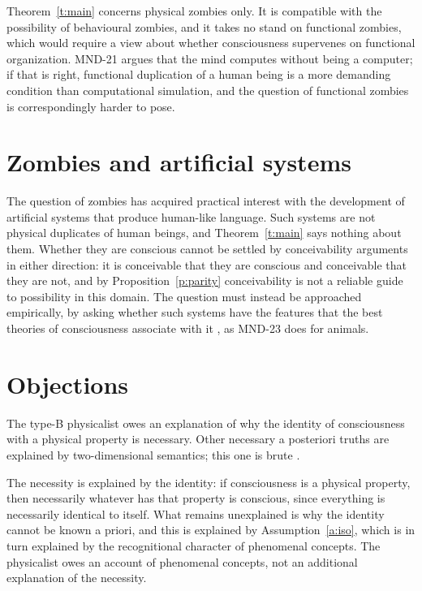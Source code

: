 \documentclass{situationist-preprint}
\begin{document}
Theorem~\ref{t:main} concerns physical zombies only. It is compatible with the possibility of behavioural zombies, and it takes no stand on functional zombies, which would require a view about whether consciousness supervenes on functional organization. MND-21 argues that the mind computes without being a computer; if that is right, functional duplication of a human being is a more demanding condition than computational simulation, and the question of functional zombies is correspondingly harder to pose.

\section{Zombies and artificial systems}

The question of zombies has acquired practical interest with the development of artificial systems that produce human-like language. Such systems are not physical duplicates of human beings, and Theorem~\ref{t:main} says nothing about them. Whether they are conscious cannot be settled by conceivability arguments in either direction: it is conceivable that they are conscious and conceivable that they are not, and by Proposition~\ref{p:parity} conceivability is not a reliable guide to possibility in this domain. The question must instead be approached empirically, by asking whether such systems have the features that the best theories of consciousness associate with it \citep{Butlin2023}, as MND-23 does for animals.

\section{Objections}

\begin{objection}
The type-B physicalist owes an explanation of why the identity of consciousness with a physical property is necessary. Other necessary a posteriori truths are explained by two-dimensional semantics; this one is brute \citep{Chalmers2002}.
\end{objection}

\begin{reply}
The necessity is explained by the identity: if consciousness is a physical property, then necessarily whatever has that property is conscious, since everything is necessarily identical to itself. What remains unexplained is why the identity cannot be known a priori, and this is explained by Assumption~\ref{a:iso}, which is in turn explained by the recognitional character of phenomenal concepts. The physicalist owes an account of phenomenal concepts, not an additional explanation of the necessity.
\end{reply}
\end{document}
